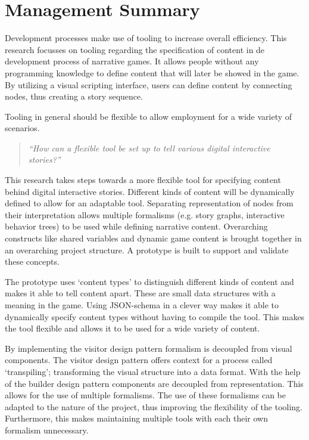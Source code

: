 \chapter*{Management Summary}
Development processes make use of tooling to increase overall efficiency. This research focusses on tooling regarding the specification of content in de development process of narrative games. It allows people without any programming knowledge to define content that will later be showed in the game. By utilizing a visual scripting interface, users can define content by connecting nodes, thus creating a story sequence.

Tooling in general should be flexible to allow employment for a wide variety of scenarios. 
\begin{quote} 
    \centering
    \large
    \textit{
        “How can a flexible tool be set up to tell various digital interactive stories?”
    }
\end{quote}

\noindent This research takes steps towards a more flexible tool for specifying content behind digital interactive stories. Different kinds of content will be dynamically defined to allow for an adaptable tool. Separating representation of nodes from their interpretation allows multiple formalisms (e.g. story graphs, interactive behavior trees) to be used while defining narrative content. Overarching constructs like shared variables and dynamic game content is brought together in an overarching project structure. A prototype is built to support and validate these concepts.

The prototype uses ‘content types’ to distinguish different kinds of content and makes it able to tell content apart. These are small data structures with a meaning in the game. Using JSON-schema in a clever way makes it able to dynamically specify content types without having to compile the tool. This makes the tool flexible and allows it to be used for a wide variety of content.

By implementing the visitor design pattern formalism is decoupled from visual components. The visitor design pattern offers context for a process called ‘transpiling’; transforming the visual structure into a data format. With the help of the builder design pattern components are decoupled from representation. This allows for the use of multiple formalisms. The use of these formalisms can be adapted to the nature of the project, thus improving the flexibility of the tooling. Furthermore, this makes maintaining multiple tools with each their own formalism unnecessary.

